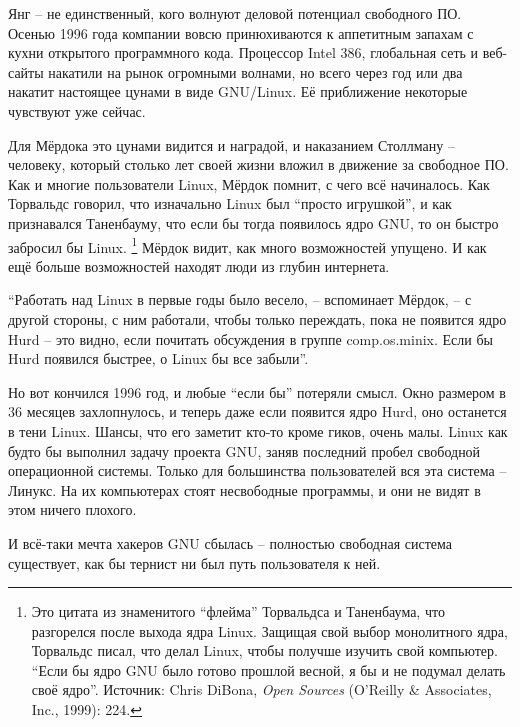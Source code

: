 Янг -- не единственный, кого волнуют деловой потенциал свободного ПО. Осенью 1996 года компании вовсю принюхиваются к аппетитным запахам с кухни открытого программного кода. Процессор Intel 386, глобальная сеть и веб-сайты накатили на рынок огромными волнами, но всего через год или два накатит настоящее цунами в виде GNU/Linux. Её приближение некоторые чувствуют уже сейчас.

Для Мёрдока это цунами видится и наградой, и наказанием Столлману -- человеку, который столько лет своей жизни вложил в движение за свободное ПО. Как и многие пользователи Linux, Мёрдок помнит, с чего всё начиналось. Как Торвальдс говорил, что изначально Linux был \enquote{просто игрушкой}, и как признавался Таненбауму, что если бы тогда появилось ядро GNU, то он быстро забросил бы Linux. \footnote{Это цитата из знаменитого \enquote{флейма} Торвальдса и Таненбаума, что разгорелся после выхода ядра Linux. Защищая свой выбор монолитного ядра, Торвальдс писал, что делал Linux, чтобы получше изучить свой компьютер. \enquote{Если бы ядро GNU было готово прошлой весной, я бы и не подумал делать своё ядро}. Источник: Chris DiBona, \textit{Open Sources} (O'Reilly \& Associates, Inc., 1999): 224.} Мёрдок видит, как много возможностей упущено. И как ещё больше возможностей находят люди из глубин интернета.

\enquote{Работать над Linux в первые годы было весело, -- вспоминает Мёрдок, -- с другой стороны, с ним работали, чтобы только переждать, пока не появится ядро Hurd -- это видно, если почитать обсуждения в группе comp.os.minix. Если бы Hurd появился быстрее, о Linux бы все забыли}.

Но вот кончился 1996 год, и любые \enquote{если бы} потеряли смысл. Окно размером в 36 месяцев захлопнулось, и теперь даже если появится ядро Hurd, оно останется в тени Linux. Шансы, что его заметит кто-то кроме гиков, очень малы. Linux как будто бы выполнил задачу проекта GNU, заняв последний пробел свободной операционной системы. Только для большинства пользователей вся эта система -- Линукс. На их компьютерах стоят несвободные программы, и они не видят в этом ничего плохого.

И всё-таки мечта хакеров GNU сбылась -- полностью свободная система существует, как бы тернист ни был путь пользователя к ней.
